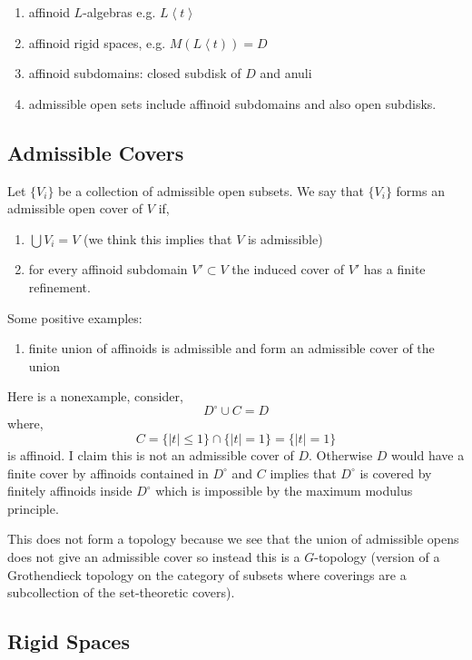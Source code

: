 \documentclass[12pt]{article}
\begin{document}
\begin{enumerate}
\item affinoid $L$-algebras e.g. $L\left< t \right>$
\item affinoid rigid spaces, e.g. $M(L\left< t \right)) = D$
\item affinoid subdomains: closed subdisk of $D$ and anuli
\item admissible open sets include affinoid subdomains and also open subdisks.
\end{enumerate}

\subsection{Admissible Covers}

Let $\{ V_i \}$ be a collection of admissible open subsets. We say that $\{ V_i \}$ forms an admissible open cover of $V$ if,
\begin{enumerate}
\item $\bigcup V_i = V$ (we think this implies that $V$ is admissible)
\item for every affinoid subdomain $V' \subset V$ the induced cover of $V'$ has a finite refinement. 
\end{enumerate}

\begin{example}
Some positive examples:
\begin{enumerate}
\item finite union of affinoids is admissible and form an admissible cover of the union
\end{enumerate}
Here is a nonexample, consider,
\[ D^\circ \cup C = D \]
where,
\[ C = \{ |t| \le 1 \} \cap \{ |t| = 1 \} = \{ |t| = 1 \} \]
is affinoid. I claim this is not an admissible cover of $D$. Otherwise $D$ would have a finite cover by affinoids contained in $D^\circ$ and $C$ implies that $D^\circ$ is covered by finitely affinoids inside $D^\circ$ which is impossible by the maximum modulus principle. 
\end{example}

\begin{rmk}
This does not form a topology because we see that the union of admissible opens does not give an admissible cover so instead this is a $G$-topology (version of a Grothendieck topology on the category of subsets where coverings are a subcollection of the set-theoretic covers).
\end{rmk}


\subsection{Rigid Spaces}
\end{document}
